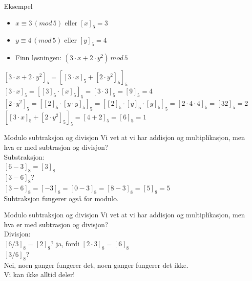 \begin{frame}{}
\begin{exampleblock}{Eksempel}
\begin{itemize}
\item $x \equiv 3\,(mod\, 5)$ eller $[x]_5=3$
\item $y \equiv 4\,(mod\, 5)$ eller $[y]_5=4$
\item Finn løsningen: $(3\cdot x+2\cdot y^2)\, mod\,5$
\end{itemize}
\end{exampleblock}
\pause
\medskip

$[3\cdot x+2\cdot y^2]_5=[[3\cdot x]_5+[2\cdot y^2]_5]_5$\\

$[3\cdot x]_5=[[3]_5\cdot [x]_5]_5=[3\cdot 3]_5=[9]_5=4$\\
$[2\cdot y^2]_5=[[2]_5\cdot [y\cdot y]_5]_5=[[2]_5\cdot [y]_5\cdot[y]_5]_5=[2\cdot 4\cdot 4]_5=[32]_5=2$\\

$[[3\cdot x]_5+[2\cdot y^2]_5]_5=[4+2]_5=[6]_5=1$
\end{frame}

\begin{frame}[fragile]{Modulo subtraksjon og divisjon}
       Vi vet at vi har addisjon og multiplikasjon, men hva er med subtrasjon og divisjon?\\

Substraksjon:\\
$[6-3]_8=[3]_8$\\
$[3-6]_8$?\\
\pause
$[3-6]_8=[-3]_8=[0-3]_8=[8-3]_8=[5]_8=5$\\

Subtraksjon fungerer også for modulo.  
\end{frame}

\begin{frame}{Modulo subtraksjon og divisjon}
Vi vet at vi har addisjon og multiplikasjon, men hva er med subtrasjon og divisjon?\\

Divisjon:\\
$[6/3]_8=[2]_8$? \pause ja, fordi $[2\cdot 3]_8=[6]_8$\\
$[3/6]_8$?\\
\pause
Nei, noen ganger fungerer det, noen ganger fungerer det ikke.\\

Vi kan ikke alltid deler!
\end{frame}

